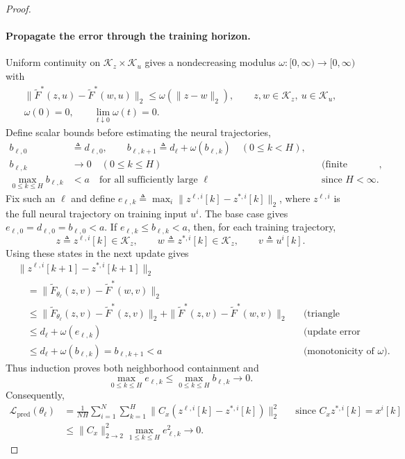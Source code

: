 \documentclass{l4dc2027}
\newcommand{\eqdef}{\triangleq}
\begin{document}
\begin{proof}
\paragraph{Propagate the error through the training horizon.}
Uniform continuity on \mbox{$\mathcal K_z\times\mathcal K_u$} gives a nondecreasing modulus \mbox{$\omega:[0,\infty)\to[0,\infty)$} with
\[
 \begin{gathered}
 \|\widetilde F^*(z,u)-\widetilde F^*(w,u)\|_2
 \le\omega(\|z-w\|_2),\qquad z,w\in\mathcal K_z,\ u\in\mathcal K_u,\\
 \omega(0)=0,\qquad\lim_{t\downarrow0}\omega(t)=0.
 \end{gathered}
\]
Define scalar bounds before estimating the neural trajectories,
\[
 \begin{aligned}
 b_{\ell,0}&\eqdef d_{\ell,0},\qquad
 b_{\ell,k+1}\eqdef d_\ell+\omega(b_{\ell,k})\quad(0\le k<H),\\
 b_{\ell,k}&\longrightarrow0\quad(0\le k\le H)
 &&\text{(finite induction)},\\
 \max_{0\le k\le H}b_{\ell,k}&<a\quad\text{for all sufficiently large }\ell
 &&\text{since }H<\infty.
 \end{aligned}
\]
Fix such an \mbox{$\ell$} and define \mbox{$e_{\ell,k}\eqdef\max_i\|z^{\ell,i}[k]-z^{*,i}[k]\|_2$}, where \mbox{$z^{\ell,i}$} is the full neural trajectory on training input \mbox{$u^i$}.
The base case gives \mbox{$e_{\ell,0}=d_{\ell,0}=b_{\ell,0}<a$}.
If \mbox{$e_{\ell,k}\le b_{\ell,k}<a$}, then, for each training trajectory,
\[
 z\eqdef z^{\ell,i}[k]\in\mathcal K_z,\qquad
 w\eqdef z^{*,i}[k]\in\mathcal K_z,\qquad v\eqdef u^i[k].
\]
Using these states in the next update gives
\[
 \begin{aligned}
 &\|z^{\ell,i}[k+1]-z^{*,i}[k+1]\|_2\\
 &\quad=\|\widetilde F_{\theta_\ell}(z,v)-\widetilde F^*(w,v)\|_2\\
 &\quad\le\|\widetilde F_{\theta_\ell}(z,v)-\widetilde F^*(z,v)\|_2
       +\|\widetilde F^*(z,v)-\widetilde F^*(w,v)\|_2
 &&\text{(triangle inequality)}\\
 &\quad\le d_\ell+\omega(e_{\ell,k})
 &&\text{(update error and continuity)}\\
 &\quad\le d_\ell+\omega(b_{\ell,k})=b_{\ell,k+1}<a
 &&\text{(monotonicity of }\omega\text{)}.
 \end{aligned}
\]
Thus induction proves both neighborhood containment and
\[
 \max_{0\le k\le H}e_{\ell,k}
 \le\max_{0\le k\le H}b_{\ell,k}\longrightarrow0.
\]
Consequently,
\[
 \begin{aligned}
 \mathcal L_{\mathrm{pred}}(\theta_\ell)
 &=\frac1{NH}\sum_{i=1}^N\sum_{k=1}^H
       \|C_x(z^{\ell,i}[k]-z^{*,i}[k])\|_2^2
 &&\text{since }C_xz^{*,i}[k]=x^i[k]\\
 &\le\|C_x\|_{2\to2}^2\max_{1\le k\le H}e_{\ell,k}^2
 \longrightarrow0.
 \end{aligned}
\]


\end{proof}
\end{document}

